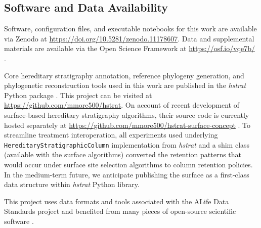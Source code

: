 \subsection{Software and Data Availability}


Software, configuration files, and executable notebooks for this work are available via Zenodo at \url{https://doi.org/10.5281/zenodo.11178607}.
Data and supplemental materials are available via the Open Science Framework at \url{https://osf.io/vqe7b/} \citep{moreno2024supplemental,foster2017open}.

Core hereditary stratigraphy annotation, reference phylogeny generation, and phylogenetic reconstruction tools used in this work are published in the \textit{hstrat} Python package \citep{moreno2022hstrat}.
This project can be visited at \url{https://github.com/mmore500/hstrat}.
On account of recent development of surface-based hereditary stratigraphy algorithms, their source code is currently hosted separately at \url{https://github.com/mmore500/hstrat-surface-concept} \citep{moreno2024hsurf}.
To streamline treatment interoperation, all experiments used underlying \texttt{HereditaryStratigraphicColumn} implementation from \textit{hstrat} and a shim class (available with the surface algorithms) converted the retention patterns that would occur under surface site selection algorithms to column retention policies.
In the medium-term future, we anticipate publishing the surface as a first-class data structure within \textit{hstrat} Python library.

This project uses data formats and tools associated with the ALife Data Standards project \citep{lalejini2019data} and benefited from many pieces of open-source scientific software \citep{sand2014tqdist,2020SciPy-NMeth,harris2020array,reback2020pandas,mckinney-proc-scipy-2010,sukumaran2010dendropy,cock2009biopython,torchiano2016effsize,waskom2021seaborn,hunter2007matplotlib,moreno2024apc,moreno2024qspool,moreno2023teeplot,hagen2021gen3sis,torchiano2016effsize}.
